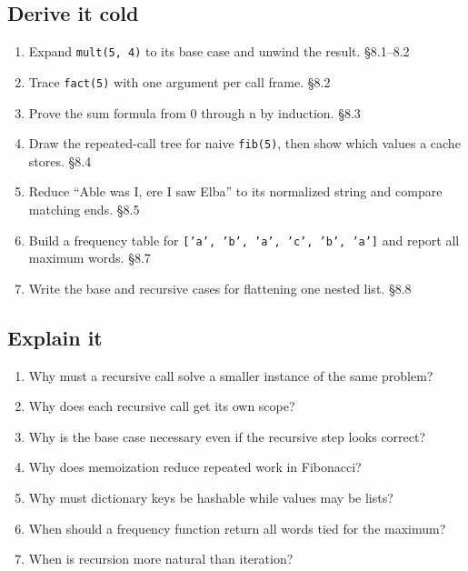 \documentclass[11pt]{article}
\begin{document}
\begin{keepsection}
\section{Derive it cold}

\begin{enumerate}
\item Expand \texttt{mult(5, 4)} to its base case and unwind the result. \hfill{\small\color{FAUblue}§8.1–8.2}
\item Trace \texttt{fact(5)} with one argument per call frame. \hfill{\small\color{FAUblue}§8.2}
\item Prove the sum formula from 0 through n by induction. \hfill{\small\color{FAUblue}§8.3}
\item Draw the repeated-call tree for naive \texttt{fib(5)}, then show which values a cache stores. \hfill{\small\color{FAUblue}§8.4}
\item Reduce “Able was I, ere I saw Elba” to its normalized string and compare matching ends. \hfill{\small\color{FAUblue}§8.5}
\item Build a frequency table for \texttt{['a', 'b', 'a', 'c', 'b', 'a']} and report all maximum words. \hfill{\small\color{FAUblue}§8.7}
\item Write the base and recursive cases for flattening one nested list. \hfill{\small\color{FAUblue}§8.8}
\end{enumerate}
\end{keepsection}

\begin{keepsection}
\section{Explain it}

\begin{enumerate}
\item Why must a recursive call solve a smaller instance of the same problem?
\item Why does each recursive call get its own scope?
\item Why is the base case necessary even if the recursive step looks correct?
\item Why does memoization reduce repeated work in Fibonacci?
\item Why must dictionary keys be hashable while values may be lists?
\item When should a frequency function return all words tied for the maximum?
\item When is recursion more natural than iteration?
\end{enumerate}

\end{keepsection}
\end{document}
